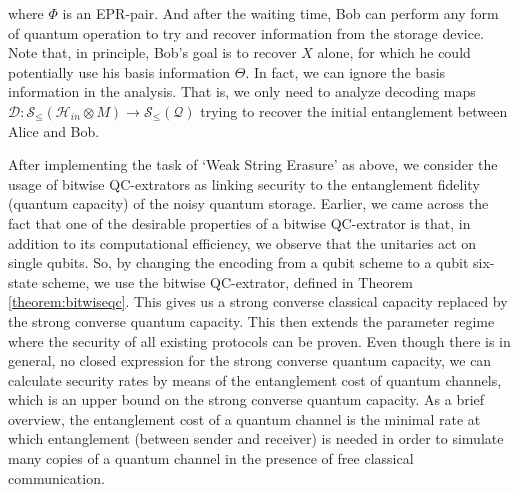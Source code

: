 \begin{definition}
where $\Phi$ is an EPR-pair. And after the waiting time, Bob can perform any form of quantum operation to try and recover information from the storage device. Note that, in principle, Bob’s goal is to recover $X$ alone, for which he could potentially use his basis information $\Theta$. In fact, we can ignore the basis information in the analysis. That is, we only need to analyze decoding maps $\mathcal{D}: \mathcal{S}_{\leq}(\mathcal{H}_{in} \otimes M) \rightarrow \mathcal{S}_{\leq}(\mathcal{Q})$ trying to recover the initial entanglement between Alice and Bob.

After implementing the task of `Weak String Erasure' as above, we consider the usage of bitwise QC-extrators as linking security to the entanglement fidelity (quantum capacity) of the noisy quantum storage. Earlier, we came across the fact that one of the desirable properties of a bitwise QC-extrator is that, in addition to its computational efficiency, we observe that the unitaries act on single qubits. So, by changing the encoding from a qubit scheme to a qubit six-state scheme, we use the bitwise QC-extrator, defined in Theorem \ref{theorem:bitwiseqc}. This gives us a strong converse classical capacity replaced by the strong converse quantum capacity. This then extends the parameter regime where the security of all existing protocols can be proven.  Even though there is in general, no closed expression for the strong converse quantum capacity, we can calculate security rates by means of the entanglement cost of quantum channels, which is an upper bound on the strong converse quantum capacity. As a brief overview, the entanglement cost of a quantum channel is the minimal rate at which entanglement (between sender and receiver) is needed in order to simulate many copies of a quantum channel in the presence of free classical communication.
\end{definition}